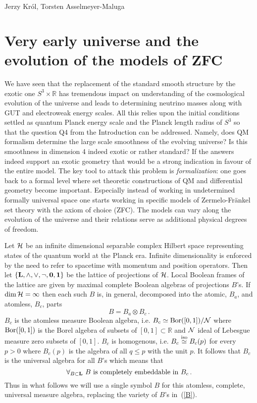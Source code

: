 \begin{artengenv2auth}{Jerzy Kr\'ol, Torsten Asselmeyer-Maluga}
\section{Very early universe and the evolution of the models of ZFC}
We have seen that
the replacement of the standard smooth structure by the exotic one $S^3\times \mathbb{R}$
has tremendous impact on understanding of the cosmological evolution of the universe and leads to determining neutrino masses along with GUT and electroweak energy scales. All this relies upon the initial conditions settled as quantum Planck energy scale and the Planck length radius of $S^3$ so that the question Q4 from the Introduction can be addressed. Namely, does QM formalism determine the large scale smoothness of the evolving universe? Is this smoothness in dimension 4 indeed exotic or rather standard? If the answers indeed support an exotic geometry that would be a strong indication in favour of the entire model. The key tool to attack this problem is {\em formalization}: one goes back to a formal level where set theoretic constructions of QM and differential geometry become important. Especially instead of working in undetermined formally universal space one starts working in specific models of Zermelo-Fr\"ankel set theory with the axiom of choice (ZFC). The models can vary along the evolution of the universe and their relations serve as additional physical degrees of freedom. 

Let ${\cal H}$ be an infinite dimensional separable complex Hilbert space representing states of the quantum world at the Planck era. Infinite dimensionality is enforced by the need to refer to spacetime with momentum and position operators. Then let $\{\bf{L},\wedge,\vee,\neg, 0,1\}$ be the lattice of projections of ${\cal H}$. Local Boolean frames of the lattice are given by maximal complete Boolean algebras of projections $B$'s. If $\dim {\cal H}=\infty $ then each such $B$ is, in general, decomposed into the atomic, $B_a$, and atomless, $B_c$, parts \parencite{Kappos1969}
\begin{equation}\label{B} B=B_a \otimes B_c\,. \end{equation}
$B_c$ is the atomless measure Boolean algebra, i.e. $B_c\simeq {\rm Bor}([0,1])/{\cal N}$ where ${\rm Bor}([0,1])$ is the Borel algebra of subsets of $[0,1]\subset \mathbb{R}$ and ${\cal N}$ ideal of Lebesgue measure zero subsets of $[0,1]$. $B_c$ is homogenous, i.e. $B_c \overset{\rm iso}{\simeq} B_c(p)$ for every $p>0$ where $B_c(p)$ is the algebra of all $q\leq p$ with the unit $p$. It follows that $B_c$ is the universal algebra for all $B$'s which means that 
\[ \forall_{B\subset {\bf L}}\ B{\text{ is completely embeddable in }} B_c \,.\]
Thus in what follows we will use a single symbol $B$ for this atomless, complete, universal measure algebra, replacing the variety of $B$'s in~(\ref{B}).


\end{artengenv2auth}
